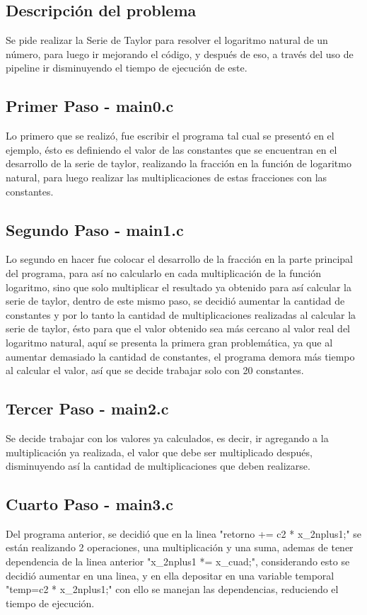 \documentclass[12pt,letterpaper]{article}
\begin{document}
\subsection{Descripción del problema}
Se pide realizar la Serie de Taylor para resolver el logaritmo natural de un número, para luego ir mejorando el código, y después de eso, a través del uso de pipeline ir disminuyendo el tiempo de ejecución de este.

\subsection{Primer Paso - main0.c}
Lo primero que se realizó, fue escribir el programa tal cual se presentó en el ejemplo, ésto es definiendo el valor de las constantes que se encuentran en el desarrollo de la serie de taylor, realizando la fracción en la función de logaritmo natural, para luego realizar las multiplicaciones de estas fracciones con las constantes.

\subsection{Segundo Paso - main1.c}
Lo segundo en hacer fue colocar el desarrollo de la fracción en la parte principal del programa, para así no calcularlo en cada multiplicación de la función logaritmo, sino que solo multiplicar el resultado ya obtenido para así calcular la serie de taylor, dentro de este mismo paso, se decidió aumentar la cantidad de constantes y por lo tanto la cantidad de multiplicaciones realizadas al calcular la serie de taylor, ésto para que el valor obtenido sea más cercano al valor real del logaritmo natural, aquí se presenta la primera gran problemática, ya que al aumentar demasiado la cantidad de constantes, el programa demora más tiempo al calcular el valor, así que se decide trabajar solo con 20 constantes.

\subsection{Tercer Paso - main2.c}
Se decide trabajar con los valores ya calculados, es decir, ir agregando a la multiplicación ya realizada, el valor que debe ser multiplicado después, disminuyendo así la cantidad de multiplicaciones que deben realizarse.

\subsection{Cuarto Paso - main3.c}
Del programa anterior, se decidió que en la linea "retorno += c2 * x\_2nplus1;" se están realizando 2 operaciones, una multiplicación y una suma, ademas de tener dependencia de la linea anterior "x\_2nplus1 *= x\_cuad;", considerando esto se decidió aumentar en una linea, y en ella depositar en una variable temporal "temp=c2 * x\_2nplus1;" con ello se manejan las dependencias, reduciendo el tiempo de ejecución.
\end{document}
